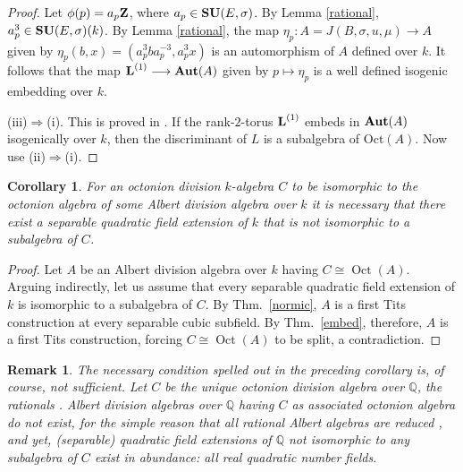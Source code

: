 \documentclass{amsart}
\newtheorem{cor}[equation]{Corollary}
\newtheorem{rem}[equation]{Remark}
\theoremstyle{definition} %
\theoremstyle{remark} %
\newcommand{\QQ}{\mathbb{Q}}
\newcommand{\IQ}{\QQ}
\DeclareMathOperator{\Oct}{Oct}
\renewcommand{\:}{\colon\,}
\numberwithin{equation}{section}
\begin{document}
\begin{proof}
	Let $\phi(p)=a_p\text{\bf Z}$, where $a_p\in\text{\bf SU}(E,\sigma)$. By Lemma \ref{rational}, $a_p^3\in\text{\bf SU}(E,\sigma)(k)$. By Lemma \ref{rational}, the map $\eta_p:A=J(B,\sigma, u, \mu)\longrightarrow A$ given by $\eta_p(b,x)=(a_p^3ba_p^{-3}, a_p^3x)$ is an automorphism of $A$ defined over $k$. It follows that the map $\text{\bf L}^{(1)}\longrightarrow\text{\bf Aut}(A)$ given by $p\mapsto \eta_p$ is a well defined isogenic embedding over $k$. 
    
  (iii)$\Rightarrow$(i). This is proved in \cite[Thm.~4.12]{MR3795634}. If the rank-$2$-torus $\text{\bf L}^{(1)}$ embeds in $\mathrm{\bf Aut}(A)$ isogenically over $k$, then the discriminant of $L$ is a subalgebra of $\mathrm{Oct}(A)$. Now use (ii)$\Rightarrow$(i). 
	\end{proof}

\begin{cor} \label{c.NECOCT}
For an octonion division $k$-algebra $C$ to be isomorphic to the octonion algebra of some Albert division algebra over $k$ it is necessary that there exist a separable quadratic field extension of $k$ that is not isomorphic to a subalgebra of $C$.     
\end{cor}

\begin{proof}
Let $A$ be an Albert division algebra over $k$ having $C \cong \Oct(A)$. Arguing indirectly, let us assume that every separable quadratic field extension of $k$ is isomorphic to a subalgebra of $C$. By Thm.~\ref{normic}, $A$ is a first Tits construction at every separable cubic subfield. By Thm.~\ref{embed}, therefore, $A$ is a first Tits construction, forcing $C \cong \Oct(A)$ to be split, a contradiction.    
\end{proof}

\begin{rem} \label{r.OCNECO}
\emph{The necessary condition spelled out in the preceding corollary is, of course, not sufficient. Let $C$ be the unique octonion division algebra over $\IQ$, the rationals \cite[Cor.~23.23]{MR4806163}. Albert division algebras over $\IQ$ having $C$ as associated octonion algebra do not exist, for the simple reason that all rational Albert algebras are reduced \cite[Cor.~46.17]{MR4806163}, and yet, (separable) quadratic field extensions of $\IQ$ not isomorphic to any subalgebra of $C$ exist in abundance: all real quadratic number fields.} 
\end{rem}
\end{document}

